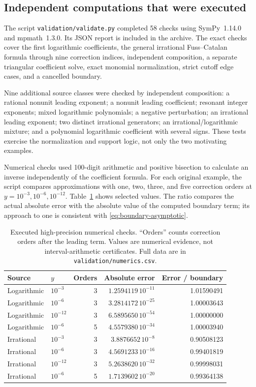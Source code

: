 \documentclass[11pt,a4paper]{article}
\numberwithin{equation}{section}
\theoremstyle{definition}\newtheorem{definition}[theorem]{Definition}
\theoremstyle{remark}\newtheorem{remark}[theorem]{Remark}
\DeclareRobustCommand{\code}[1]{{\small\ttfamily\urlstyle{same}\nolinkurl{#1}}}
\begin{document}
\subsection{Independent computations that were executed}
The script \code{validation/validate.py} completed 58 checks using
SymPy~1.14.0 and mpmath~1.3.0. Its JSON report is included in the archive.
The exact checks cover the first logarithmic coefficients, the general
irrational Fuss--Catalan formula through nine correction indices, independent
composition, a separate triangular coefficient solve, exact monomial
normalization, strict cutoff edge cases, and a cancelled boundary.

Nine additional source classes were checked by independent composition:
a rational nonunit leading exponent; a nonunit leading coefficient;
resonant integer exponents; mixed logarithmic polynomials; a negative
perturbation; an irrational leading exponent; two distinct irrational
generators; an irrational/logarithmic mixture; and a polynomial logarithmic
coefficient with several signs. These tests exercise the normalization and
support logic, not only the two motivating examples.

Numerical checks used 100-digit arithmetic and positive bisection to
calculate an inverse independently of the coefficient formula. For each
original example, the script compares approximations with one, two, three,
and five correction orders at \(y=10^{-3},10^{-6},10^{-12}\).
Table~\ref{tab:numerics} shows selected values. The ratio compares the actual
absolute error with the absolute value of the computed boundary term;
its approach to one is consistent with \eqref{eq:boundary-asymptotic}.

\begin{table}[htbp]
\centering\small
\begin{tabular}{@{}llrrr@{}}
\toprule
Source & \(y\) & Orders & Absolute error & Error / boundary \\
\midrule
Logarithmic & \(10^{-3}\) & 3 & \(1.2594119\,10^{-11}\) & 1.01590491 \\
Logarithmic & \(10^{-6}\) & 3 & \(3.2814172\,10^{-25}\) & 1.00003643 \\
Logarithmic & \(10^{-12}\) & 3 & \(6.5895650\,10^{-54}\) & 1.00000000 \\
Logarithmic & \(10^{-6}\) & 5 & \(4.5579380\,10^{-34}\) & 1.00003940 \\
Irrational & \(10^{-3}\) & 3 & \(3.8876652\,10^{-8}\) & 0.90508123 \\
Irrational & \(10^{-6}\) & 3 & \(4.5691233\,10^{-16}\) & 0.99401819 \\
Irrational & \(10^{-12}\) & 3 & \(5.2638620\,10^{-32}\) & 0.99998031 \\
Irrational & \(10^{-6}\) & 5 & \(1.7139602\,10^{-20}\) & 0.99364138 \\
\bottomrule
\end{tabular}
\caption{Executed high-precision numerical checks. ``Orders'' counts
correction orders after the leading term. Values are numerical evidence,
not interval-arithmetic certificates. Full data are in
\code{validation/numerics.csv}.}
\label{tab:numerics}
\end{table}
\end{document}
